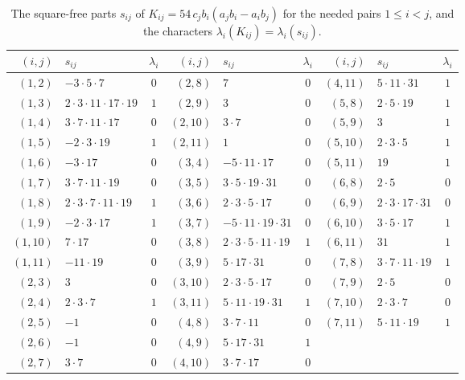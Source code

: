 \documentclass[12pt,oneside,openany]{book}
\theoremstyle{definition}
\theoremstyle{plain}
\numberwithin{equation}{chapter}
\theoremstyle{plain}
\theoremstyle{definition}
\theoremstyle{remark}
\begin{document}
\begin{table}[htbp]
\centering
\caption{The square-free parts $s_{ij}$ of $K_{ij}=54\,c_jb_i(a_jb_i-a_ib_j)$ for the needed pairs $1\le i<j$, and the characters $\lambda_i(K_{ij})=\lambda_i(s_{ij})$.}\label{tab:r5-K}
\small
\setlength{\tabcolsep}{4pt}
\begin{tabular}{rlc@{\quad}rlc@{\quad}rlc}
\toprule
$(i,j)$ & $s_{ij}$ & $\lambda_i$ & $(i,j)$ & $s_{ij}$ & $\lambda_i$ & $(i,j)$ & $s_{ij}$ & $\lambda_i$\\
\midrule
$(1,2)$ & $-3\cdot 5\cdot 7$ & $0$ & $(2,8)$ & $7$ & $0$ & $(4,11)$ & $5\cdot 11\cdot 31$ & $1$ \\
$(1,3)$ & $2\cdot 3\cdot 11\cdot 17\cdot 19$ & $1$ & $(2,9)$ & $3$ & $0$ & $(5,8)$ & $2\cdot 5\cdot 19$ & $1$ \\
$(1,4)$ & $3\cdot 7\cdot 11\cdot 17$ & $0$ & $(2,10)$ & $3\cdot 7$ & $0$ & $(5,9)$ & $3$ & $1$ \\
$(1,5)$ & $-2\cdot 3\cdot 19$ & $1$ & $(2,11)$ & $1$ & $0$ & $(5,10)$ & $2\cdot 3\cdot 5$ & $1$ \\
$(1,6)$ & $-3\cdot 17$ & $0$ & $(3,4)$ & $-5\cdot 11\cdot 17$ & $0$ & $(5,11)$ & $19$ & $1$ \\
$(1,7)$ & $3\cdot 7\cdot 11\cdot 19$ & $0$ & $(3,5)$ & $3\cdot 5\cdot 19\cdot 31$ & $0$ & $(6,8)$ & $2\cdot 5$ & $0$ \\
$(1,8)$ & $2\cdot 3\cdot 7\cdot 11\cdot 19$ & $1$ & $(3,6)$ & $2\cdot 3\cdot 5\cdot 17$ & $0$ & $(6,9)$ & $2\cdot 3\cdot 17\cdot 31$ & $0$ \\
$(1,9)$ & $-2\cdot 3\cdot 17$ & $1$ & $(3,7)$ & $-5\cdot 11\cdot 19\cdot 31$ & $0$ & $(6,10)$ & $3\cdot 5\cdot 17$ & $1$ \\
$(1,10)$ & $7\cdot 17$ & $0$ & $(3,8)$ & $2\cdot 3\cdot 5\cdot 11\cdot 19$ & $1$ & $(6,11)$ & $31$ & $1$ \\
$(1,11)$ & $-11\cdot 19$ & $0$ & $(3,9)$ & $5\cdot 17\cdot 31$ & $0$ & $(7,8)$ & $3\cdot 7\cdot 11\cdot 19$ & $1$ \\
$(2,3)$ & $3$ & $0$ & $(3,10)$ & $2\cdot 3\cdot 5\cdot 17$ & $0$ & $(7,9)$ & $2\cdot 5$ & $0$ \\
$(2,4)$ & $2\cdot 3\cdot 7$ & $1$ & $(3,11)$ & $5\cdot 11\cdot 19\cdot 31$ & $1$ & $(7,10)$ & $2\cdot 3\cdot 7$ & $0$ \\
$(2,5)$ & $-1$ & $0$ & $(4,8)$ & $3\cdot 7\cdot 11$ & $0$ & $(7,11)$ & $5\cdot 11\cdot 19$ & $1$ \\
$(2,6)$ & $-1$ & $0$ & $(4,9)$ & $5\cdot 17\cdot 31$ & $1$ & & & \\
$(2,7)$ & $3\cdot 7$ & $0$ & $(4,10)$ & $3\cdot 7\cdot 17$ & $0$ & & & \\
\bottomrule
\end{tabular}
\end{table}
\end{document}
